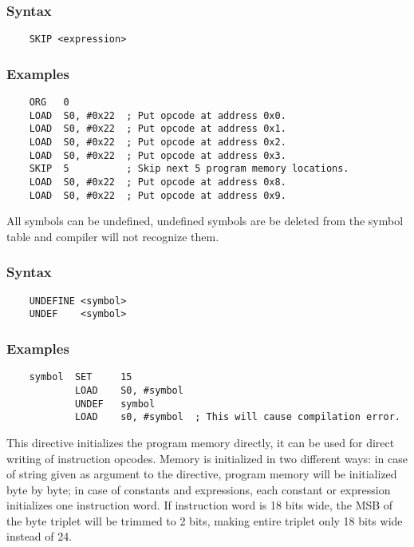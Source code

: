     \subsubsection{Syntax}
        \verb'    SKIP <expression>'

    \subsubsection{Examples}
        \verb'    ORG   0'\\
        \verb'    LOAD  S0, #0x22  ; Put opcode at address 0x0.'\\
        \verb'    LOAD  S0, #0x22  ; Put opcode at address 0x1.'\\
        \verb'    LOAD  S0, #0x22  ; Put opcode at address 0x2.'\\
        \verb'    LOAD  S0, #0x22  ; Put opcode at address 0x3.'\\
        \verb'    SKIP  5          ; Skip next 5 program memory locations.'\\
        \verb'    LOAD  S0, #0x22  ; Put opcode at address 0x8.'\\
        \verb'    LOAD  S0, #0x22  ; Put opcode at address 0x9.'

    All symbols can be undefined, undefined symbols are be deleted from the symbol table and compiler will not recognize them.

    \subsubsection{Syntax}
        \verb'    UNDEFINE <symbol>'\\
        \verb'    UNDEF    <symbol>'

    \subsubsection{Examples}
        \verb'    symbol  SET     15'\\
        \verb'            LOAD    S0, #symbol'\\
        \verb'            UNDEF   symbol'\\
        \verb'            LOAD    s0, #symbol  ; This will cause compilation error.'

\clearpage
{}
    This directive initializes the program memory directly, it can be used for direct writing of instruction opcodes. Memory is initialized in two different ways: in case of string given as argument to the directive, program memory will be initialized byte by byte; in case of constants and expressions, each constant or expression initializes one instruction word. If instruction word is 18 bits wide, the MSB of the byte triplet will be trimmed to 2 bits, making entire triplet only 18 bits wide instead of 24.

